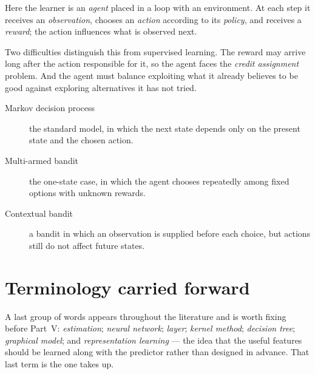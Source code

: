 Here the learner is an \emph{agent} placed in a loop with an environment. At
each step it receives an \emph{observation}, chooses an \emph{action} according
to its \emph{policy}, and receives a \emph{reward}; the action influences what is
observed next.

Two difficulties distinguish this from supervised learning. The reward may
arrive long after the action responsible for it, so the agent faces the
\emph{credit assignment} problem. And the agent must balance exploiting what it
already believes to be good against exploring alternatives it has not tried.

\begin{description}
	\item[Markov decision process] the standard model, in which the next state
	depends only on the present state and the chosen action.
	\item[Multi-armed bandit] the one-state case, in which the agent chooses
	repeatedly among fixed options with unknown rewards.
	\item[Contextual bandit] a bandit in which an observation is supplied before
	each choice, but actions still do not affect future states.
\end{description}


\section{Terminology carried forward}

A last group of words appears throughout the literature and is worth fixing
before Part~V: \emph{estimation}; \emph{neural network}; \emph{layer};
\emph{kernel method}; \emph{decision tree}; \emph{graphical model}; and
\emph{representation learning} --- the idea that the useful features should be
learned along with the predictor rather than designed in advance. That last term
is the one  takes up.
